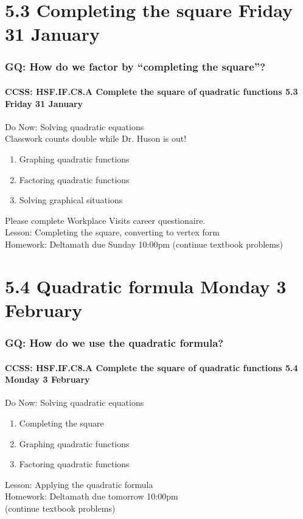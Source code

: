 \documentclass{beamer}
\begin{document}
\section{5.3 Completing the square \hfill Friday 31 January}
\frame
{
  \frametitle{GQ: How do we factor by ``completing the square''?}
  \framesubtitle{CCSS: HSF.IF.C8.A Complete the square of quadratic functions \hfill \alert{5.3 Friday 31 January}}

  \begin{block}{Do Now: Solving quadratic equations\\[0.25cm]
    \alert{Classwork counts double while Dr. Huson is out!}}
    \begin{enumerate}
      \item Graphing quadratic functions
      \item Factoring quadratic functions
      \item Solving graphical situations
    \end{enumerate}
    \end{block}
    Please complete Workplace Visits career questionaire. \\ \smallskip
    Lesson: Completing the square, converting to vertex form\\ \smallskip
    Homework: Deltamath due Sunday 10:00pm (continue textbook problems)
    }

\section{5.4 Quadratic formula \hfill Monday 3 February}
\frame
{
  \frametitle{GQ: How do we use the quadratic formula?}
  \framesubtitle{CCSS: HSF.IF.C8.A Complete the square of quadratic functions \hfill \alert{5.4 Monday 3 February}}

  \begin{block}{Do Now: Solving quadratic equations}
    \begin{enumerate}
      \item Completing the square
      \item Graphing quadratic functions
      \item Factoring quadratic functions
    \end{enumerate}
    \end{block}
    Lesson: Applying the quadratic formula\\ \smallskip
    Homework: Deltamath due tomorrow 10:00pm \\ \quad (continue textbook problems)
    }
\end{document}
